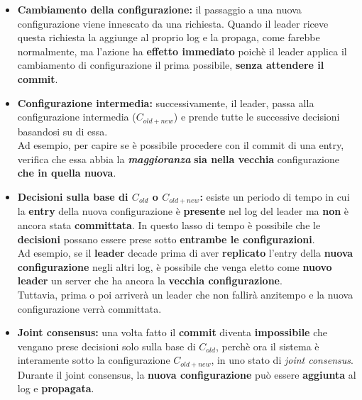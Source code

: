     \begin{itemize}
      \item{\textbf{Cambiamento della configurazione:} il passaggio a una nuova configurazione viene innescato da una richiesta. Quando il leader riceve questa richiesta la aggiunge al proprio log e la propaga, come farebbe normalmente, ma l'azione ha \textbf{effetto immediato} poichè il leader applica il cambiamento di configurazione il prima possibile, \textbf{senza attendere il commit}.}

      \item{\textbf{Configurazione intermedia:} successivamente, il leader, passa alla configurazione intermedia ($C_{old + new}$) e prende tutte le successive decisioni basandosi su di essa.\\
      Ad esempio, per capire se è possibile procedere con il commit di una entry, verifica che essa abbia la \textbf{\textit{maggioranza}} \textbf{sia nella vecchia} configurazione \textbf{che in quella nuova}.} 

      \item{\textbf{Decisioni sulla base di $C_{old}$ o $C_{old+new}$:} esiste un periodo di tempo in cui la \textbf{entry} della nuova configurazione è \textbf{presente} nel log del leader ma \textbf{non} è ancora stata \textbf{committata}. In questo lasso di tempo è possibile che le \textbf{decisioni} possano essere prese sotto \textbf{entrambe le configurazioni}.\\
      Ad esempio, se il \textbf{leader} decade prima di aver \textbf{replicato} l'entry della \textbf{nuova configurazione} negli altri log, è possibile che venga eletto come \textbf{nuovo leader} un server che ha ancora la \textbf{vecchia configurazione}.\\
      Tuttavia, prima o poi arriverà un leader che non fallirà anzitempo e la nuova configurazione verrà committata. } 

      \item{\textbf{Joint consensus:} una volta fatto il \textbf{commit} diventa \textbf{impossibile} che vengano prese decisioni solo sulla base di $C_{old}$, perchè ora il sistema è interamente sotto la configurazione \textit{$C_{old+new}$}, in uno stato di \textit{joint consensus}.
      Durante il joint consensus, la \textbf{nuova configurazione} può essere \textbf{aggiunta} al log e \textbf{propagata}.} 



\end{itemize}
